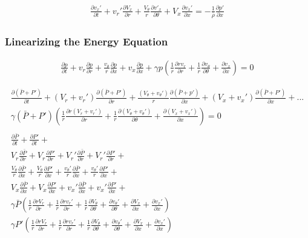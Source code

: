 \begin{align*}
\boxed{
	\frac{\partial  v_x' }{\partial t} +
	v_r' \frac{\partial  V_x  }{\partial r} +
	\frac{V_{\theta}}{r} \frac{\partial v'_x}{\partial \theta} +
	V_x \frac{\partial v_x'}{\partial x} 
	= -\frac{1    }{\bar{\rho}}  \frac{\partial p'}{\partial x} 
}
\end{align*}

\newpage

\subsubsection{Linearizing the Energy Equation}
\begin{align*}
\frac{\partial p}{\partial t} + v_r \frac{\partial p}{\partial r} + \frac{v_{\theta}}{r}\frac{\partial p}{\partial x} + v_x \frac{\partial p}{\partial x} 
+ \gamma p \left(\frac{1}{r} \frac{\partial r v_r}{\partial r} + \frac{1}{r} \frac{\partial v_{\theta}}{\partial \theta} + \frac{\partial v_x}{\partial x}\right) = 0
\end{align*}

\begin{align*}
\frac{\partial (\bar{P}+P')}{\partial t} + 
(V_r + v_r')
\frac{ \partial (\bar{P}+P')}{\partial r} + 
\frac{  (V_{\theta} + v_{\theta}') }{r}\frac{\partial (\bar{ P} +p') }{\partial x} + 
(V_x + v_x') 
\frac{\partial  (\bar{P}+P')}{\partial x} + ...\\
\gamma (\bar{P}+P') 
\left(
\frac{1}{r} \frac{\partial r (V_r + v_r')}{\partial r} + 
\frac{1}{r} \frac{\partial   (V_{\theta} + v_{\theta}')}{\partial \theta} + 
\frac{\partial (V_x + v_x')}{\partial x}
\right) = 0  	\\
\\
\frac{\partial \bar{P} }{\partial t} +
\frac{\partial      P' }{\partial t} +\\
V_r  \frac{\partial \bar{P}}{\partial r} + 
V_r  \frac{\partial    P'}{\partial r} + 
V_r' \frac{\partial \bar{P}}{\partial r} + 
V_r' \frac{\partial      P'}{\partial r} + \\     
\frac{V_{\theta}}{r} \frac{\partial \bar{ P}}{\partial x} + 
\frac{V_{\theta}}{r} \frac{\partial       P'}{\partial x} +
\frac{v_{\theta}'}{r} \frac{\partial \bar{ P}}{\partial x} + 
\frac{v_{\theta}'}{r} \frac{\partial       P'}{\partial x} + \\
V_x  \frac{\partial \bar{P}}{\partial x} + 
V_x  \frac{\partial    P'}{\partial x} + 
v_x' \frac{\partial \bar{P}}{\partial x} + 
v_x' \frac{\partial      P'}{\partial x} + \\ 
\gamma \bar{ P}  \left(
\frac{1}{r} \frac{\partial r V_r}{\partial r} + 
\frac{1}{r} \frac{\partial r v_r'}{\partial r} +
\frac{1}{r} \frac{\partial V_{\theta}}{\partial \theta} + 
\frac{\partial v_{\theta}'}{\partial \theta}+ 
\frac{\partial V_x}{\partial x} + 
\frac{\partial v_x'}{\partial x} 
\right) \\
\gamma P' \left(
\frac{1}{r} \frac{\partial r V_r}{\partial r} + 
\frac{1}{r} \frac{\partial r v_r'}{\partial r} + 
\frac{1}{r} \frac{\partial V_{\theta}}{\partial \theta} + 
\frac{\partial v_{\theta}'}{\partial \theta}+ \frac{\partial V_x}{\partial x} +
\frac{\partial v_x'}{\partial x}\right) 
\end{align*}

